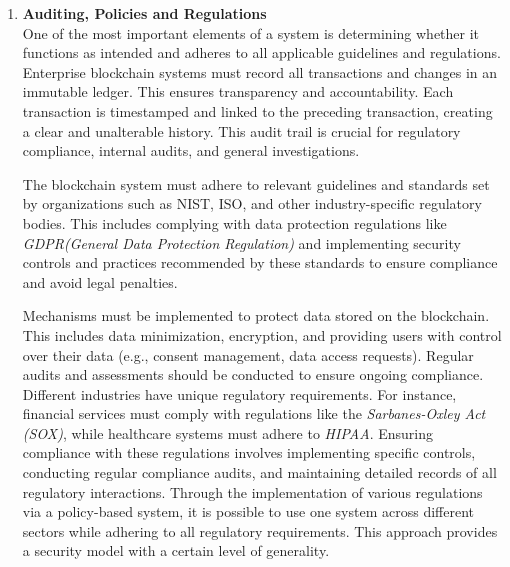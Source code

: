 \begin{enumerate}[label=\textbullet]
	\item\textbf{Auditing, Policies and Regulations}\cite{hype_security}\cite{nist_pub_bloc_acc_ctrl}\\
	One of the most important elements of a system is determining whether it functions as intended and adheres to all applicable guidelines and regulations. Enterprise blockchain systems must record all transactions and changes in an immutable ledger. This ensures transparency and accountability. Each transaction is timestamped and linked to the preceding transaction, creating a clear and unalterable history. This audit trail is crucial for regulatory compliance, internal audits, and general investigations.
	
	The blockchain system must adhere to relevant guidelines and standards set by organizations such as NIST, ISO, and other industry-specific regulatory bodies. This includes complying with data protection regulations like \textit{GDPR(General Data Protection Regulation)}\cite{gpdr_std} and implementing security controls and practices recommended by these standards to ensure compliance and avoid legal penalties.
	
	Mechanisms must be implemented to protect data stored on the blockchain. This includes data minimization, encryption, and providing users with control over their data (e.g., consent management, data access requests). Regular audits and assessments should be conducted to ensure ongoing compliance. Different industries have unique regulatory requirements. For instance, financial services must comply with regulations like the \textit{Sarbanes-Oxley Act (SOX)}, while healthcare systems must adhere to \textit{HIPAA}. Ensuring compliance with these regulations involves implementing specific controls, conducting regular compliance audits, and maintaining detailed records of all regulatory interactions.
	Through the implementation of various regulations via a policy-based system, it is possible to use one system across different sectors while adhering to all regulatory requirements. This approach provides a security model with a certain level of generality.   
\end{enumerate}


